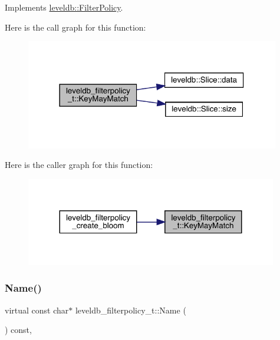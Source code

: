 Implements \mbox{\hyperlink{classleveldb_1_1_filter_policy_a6f8ba10ea25e0b4b8d0a6607c361c718}{leveldb\+::\+Filter\+Policy}}.

Here is the call graph for this function\+:
\nopagebreak
\begin{figure}[H]
\begin{center}
\leavevmode
\includegraphics[width=314pt]{structleveldb__filterpolicy__t_a76ed49d956a58622e86d87a89a9ba1f1_cgraph}
\end{center}
\end{figure}
Here is the caller graph for this function\+:
\nopagebreak
\begin{figure}[H]
\begin{center}
\leavevmode
\includegraphics[width=311pt]{structleveldb__filterpolicy__t_a76ed49d956a58622e86d87a89a9ba1f1_icgraph}
\end{center}
\end{figure}
\mbox{\label{structleveldb__filterpolicy__t_a94f31f3d4576ed53d9277e461717e9f3}} 
\subsubsection{\texorpdfstring{Name()}{Name()}}
{\footnotesize\ttfamily virtual const char$\ast$ leveldb\+\_\+filterpolicy\+\_\+t\+::\+Name (\begin{DoxyParamCaption}{ }\end{DoxyParamCaption}) const\hspace{0.3cm}{\ttfamily [inline]}, {\ttfamily [virtual]}}




